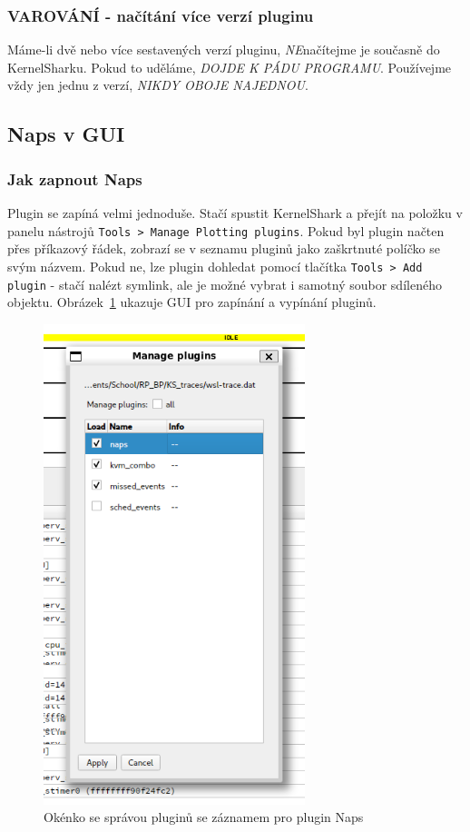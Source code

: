 \subsubsection{VAROVÁNÍ - načítání více verzí pluginu}

Máme-li dvě nebo více sestavených verzí pluginu, \emph{NE}načítejme je současně do KernelSharku. Pokud to uděláme, \emph{DOJDE K PÁDU PROGRAMU}. Používejme vždy jen jednu z verzí, \emph{NIKDY OBOJE NAJEDNOU}.

\subsection{Naps v GUI}
\subsubsection{Jak zapnout Naps}

Plugin se zapíná velmi jednoduše. Stačí spustit KernelShark a přejít na položku v panelu nástrojů \texttt{Tools > Manage Plotting plugins}. Pokud byl plugin načten přes příkazový řádek, zobrazí se v seznamu pluginů jako zaškrtnuté políčko se svým názvem. Pokud ne, lze plugin dohledat pomocí tlačítka \texttt{Tools > Add plugin} - stačí nalézt symlink, ale je možné vybrat i samotný soubor sdíleného objektu. Obrázek~\ref{naps-manage-plot-plugs} ukazuje GUI pro zapínání a vypínání pluginů.

\begin{figure}[p]\centering
    \includegraphics[height=140mm]{img/Naps/NapsManagePlottingPlugins}
    \caption{Okénko se správou pluginů se záznamem pro plugin Naps}
    \label{naps-manage-plot-plugs}
\end{figure}

